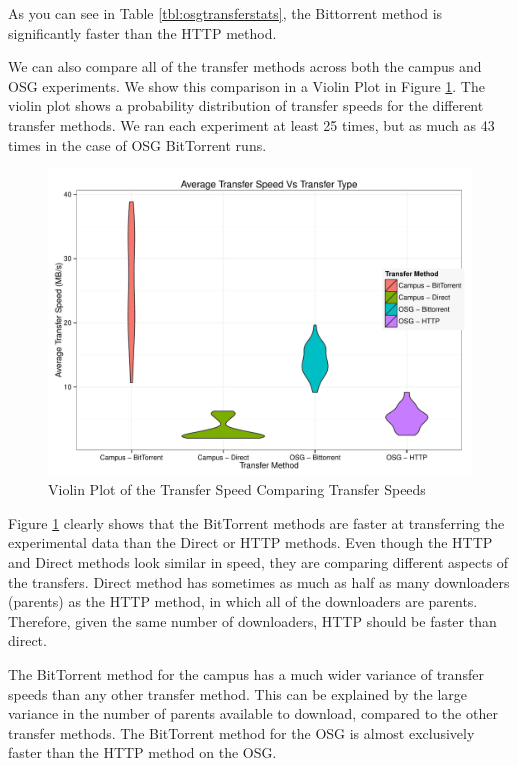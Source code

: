 As you can see in Table \ref{tbl:osgtransferstats}, the Bittorrent method is significantly faster than the HTTP method.  

We can also compare all of the transfer methods across both the campus and OSG experiments.  We show this comparison in a Violin Plot \cite{hintze1998violin} in Figure \ref{fig:violinplots}.  The violin plot shows a probability distribution of transfer speeds for the different transfer methods.  We ran each experiment at least 25 times, but as much as 43 times in the case of OSG BitTorrent runs.

\begin{figure}[h!t]
\includegraphics[width=\textwidth]{images/ViolinPlot.pdf}
\caption{Violin Plot of the Transfer Speed Comparing Transfer Speeds}
\label{fig:violinplots}
\end{figure}

Figure \ref{fig:violinplots} clearly shows that the BitTorrent methods are faster at transferring the experimental data than the Direct or HTTP methods.  Even though the HTTP and Direct methods look similar in speed, they are comparing different aspects of the transfers.  Direct method has sometimes as much as half as many downloaders (parents) as the HTTP method, in which all of the downloaders are parents.  Therefore, given the same number of downloaders, HTTP should be faster than direct.

The BitTorrent method for the campus has a much wider variance of transfer speeds than any other transfer method.  This can be explained by the large variance in the number of parents available to download, compared to the other transfer methods.  The BitTorrent method for the OSG is almost exclusively faster than the HTTP method on the OSG.

